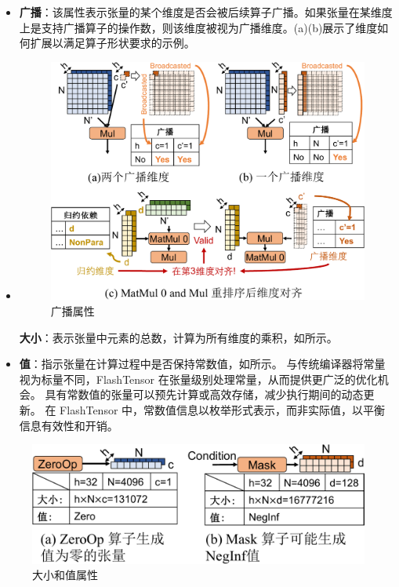 \begin{itemize}
\item
\textbf{广播}：该属性表示张量的某个维度是否会被后续算子广播。如果张量在某维度上是支持广播算子的操作数，则该维度被视为广播维度。(a)(b)展示了维度如何扩展以满足算子形状要求的示例。
\item
\begin{figure}[ht]
    \centering
    \includegraphics[width=0.65\linewidth]{figures/flashtensor/property_definition_broadcast-crop.pdf}
    \caption{广播属性}
    \label{fig:property_definition_broadcast}
\end{figure}

\textbf{大小}：表示张量中元素的总数，计算为所有维度的乘积，如所示。
\item
\textbf{值}：指示张量在计算过程中是否保持常数值，如所示。
与传统编译器将常量视为标量不同，FlashTensor 在张量级别处理常量，从而提供更广泛的优化机会。
具有常数值的张量可以预先计算或高效存储，减少执行期间的动态更新。
在 FlashTensor 中，常数值信息以枚举形式表示，而非实际值，以平衡信息有效性和开销。
\end{itemize}





\begin{figure}[htbp]
    \centering
    \includegraphics[width=0.52\linewidth]{figures/flashtensor/property_definition_size_and_value-crop.pdf}
    \caption{大小和值属性}
    \label{fig:property_definition_size_and_value}
\end{figure}



